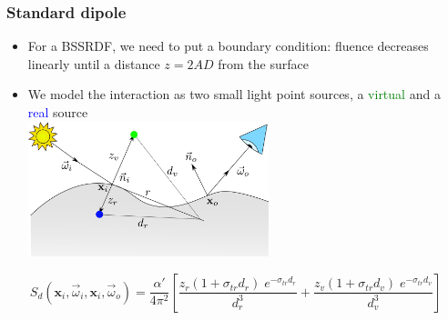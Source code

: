 \documentclass{beamer}
\newcommand{\vomega}{\vec{\omega}}
\newcommand{\x}{\mathbf{x}}
\begin{document}
\begin{frame}
    \frametitle{Standard dipole}
			\begin{itemize}
			\vspace{0.5cm}
				\item For a BSSRDF, we need to put a boundary condition: fluence decreases linearly until a distance $z = 2AD$ from the surface
				\item We model the interaction as two small light point sources, a \textcolor{green}{virtual} and a \textcolor{blue}{real} source \\
				\centering
				\vspace{0.2cm}
				\includegraphics[width=0.55\textwidth]{jensen}
			\end{itemize}
	$$
S_d(\x_i,\vomega_i,\x_i,\vomega_o) = \frac{\alpha'}{4 \pi^2} \left[\frac{z_r (1 + \sigma_{tr} d_r) \; e^{-\sigma_{tr} d_r}}{d_r^3} + \frac{z_v (1 + \sigma_{tr} d_v) \; e^{-\sigma_{tr} d_v}}{d_v^3} \right]
$$			
\end{frame}
\end{document}
